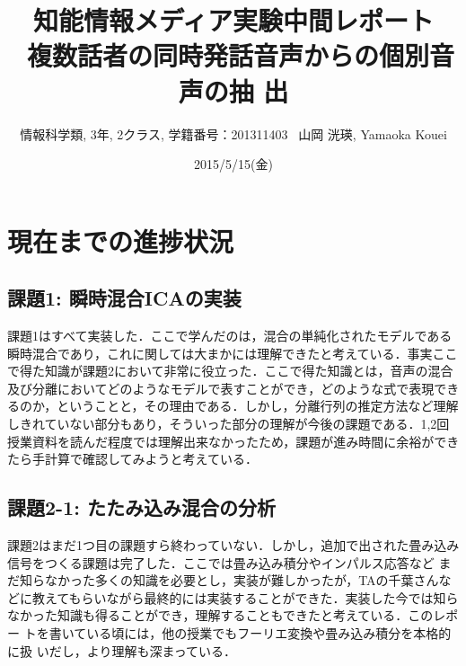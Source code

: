 \documentclass[a4j]{jarticle}
\title{知能情報メディア実験中間レポート \\ \ 複数話者の同時発話音声からの個別音声の抽
出}
\author{情報科学類, 3年, 2クラス, 学籍番号：201311403 \ 山岡 洸瑛, Yamaoka
Kouei}
\date{2015/5/15(金)}
\begin{document}
 \maketitle
\section*{現在までの進捗状況}
\subsection*{課題1: 瞬時混合ICAの実装}
課題1はすべて実装した．ここで学んだのは，混合の単純化されたモデルである
瞬時混合であり，これに関しては大まかには理解できたと考えている．事実ここ
で得た知識が課題2において非常に役立った．ここで得た知識とは，音声の混合
及び分離においてどのようなモデルで表すことができ，どのような式で表現でき
るのか，ということと，その理由である．しかし，分離行列の推定方法など理解
しきれていない部分もあり，そういった部分の理解が今後の課題である．1,2回
授業資料を読んだ程度では理解出来なかったため，課題が進み時間に余裕ができ
たら手計算で確認してみようと考えている．

\subsection*{課題2-1: たたみ込み混合の分析}
課題2はまだ1つ目の課題すら終わっていない．しかし，追加で出された畳み込み
信号をつくる課題は完了した．ここでは畳み込み積分やインパルス応答など
まだ知らなかった多くの知識を必要とし，実装が難しかったが，TAの千葉さんな
どに教えてもらいながら最終的には実装することができた．実装した今では知ら
なかった知識も得ることができ，理解することもできたと考えている．このレポー
トを書いている頃には，他の授業でもフーリエ変換や畳み込み積分を本格的に扱
いだし，より理解も深まっている．
\end{document}
